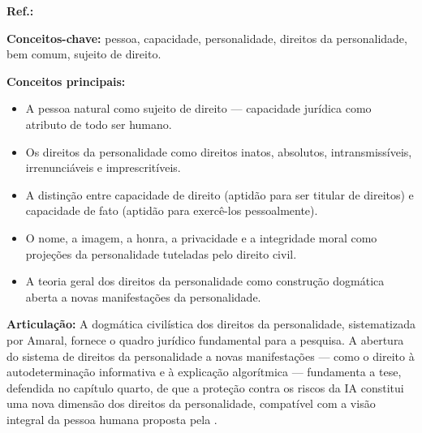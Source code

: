 \begin{fichamento}
    \textbf{Ref.:} \cite{Amaral2003DBC}
    
    \textbf{Conceitos-chave:} pessoa, capacidade, personalidade, direitos da personalidade, bem comum, sujeito de direito.
    
    \textbf{Conceitos principais:}
    \begin{itemize}
        \item A pessoa natural como sujeito de direito — capacidade jurídica como atributo de todo ser humano.
        \item Os direitos da personalidade como direitos inatos, absolutos, intransmissíveis, irrenunciáveis e imprescritíveis.
        \item A distinção entre capacidade de direito (aptidão para ser titular de direitos) e capacidade de fato (aptidão para exercê-los pessoalmente).
        \item O nome, a imagem, a honra, a privacidade e a integridade moral como projeções da personalidade tuteladas pelo direito civil.
        \item A teoria geral dos direitos da personalidade como construção dogmática aberta a novas manifestações da personalidade.
    \end{itemize}
    
    \textbf{Articulação:} A dogmática civilística dos direitos da personalidade, sistematizada por Amaral, fornece o quadro jurídico fundamental para a pesquisa. A abertura do sistema de direitos da personalidade a novas manifestações — como o direito à autodeterminação informativa e à explicação algorítmica — fundamenta a tese, defendida no capítulo quarto, de que a proteção contra os riscos da IA constitui uma nova dimensão dos direitos da personalidade, compatível com a visão integral da pessoa humana proposta pela \MH{}.
\end{fichamento}

